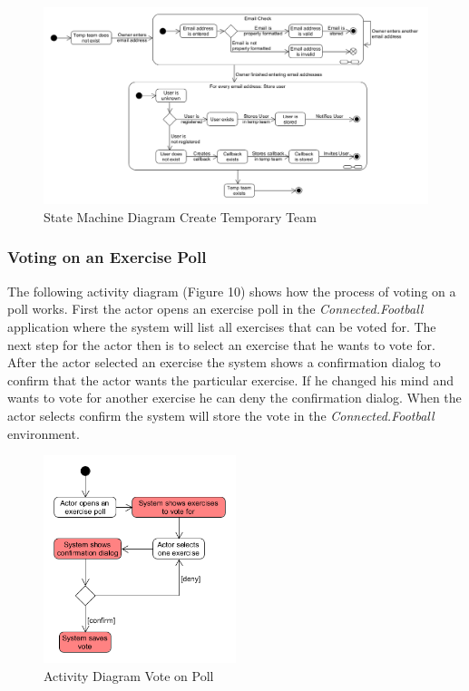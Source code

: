\begin{figure}[H]
    \begin{center}
        \includegraphics[width=1\textwidth]{images/diagrams/state_machine_diagrams/StateDiagram_CreateTempTeam.png}
        \caption{State Machine Diagram Create Temporary Team}
        \label{fig:state_machine_diagram_create_temp_team}
    \end{center}
\end{figure}

\subsubsection{Voting on an Exercise Poll}
\label{sssec:voting_on_exercise_poll}
The following activity diagram (Figure 10) shows how the process of voting on a poll works. First the actor opens an exercise poll in the \textit{Connected.Football} application where the system will list all exercises that can be voted for. The next step for the actor then is to select an exercise that he wants to vote for. After the actor selected an exercise the system shows a confirmation dialog to confirm that the actor wants the particular exercise. If he changed his mind and wants to vote for another exercise he can deny the confirmation dialog. When the actor selects confirm the system will store the vote in the \textit{Connected.Football} environment. 

\begin{figure}[H]
    \begin{center}
        \includegraphics[width=0.5\textwidth]{images/diagrams/activity_diagrams/ActivityDiagram_VoteOnExercisePoll.png}
        \caption{Activity Diagram Vote on Poll}
        \label{fig:activity_diagram_vote_on_poll}
    \end{center}
\end{figure}

